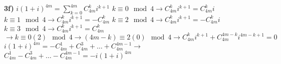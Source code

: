 \documentclass[12pt,a4paper,fleqn]{article}
\begin{document}
{\bf 3f)} $i(1 + i)^{4m} = \sum_{k = 0}^{4m} C_{4m}^k i^{k + 1}$ \newline
$k \equiv 0 \mod 4 \rightarrow C_{4m}^k i^{k + 1} = C_{4m}^k i$ \newline
$k \equiv 1 \mod 4 \rightarrow C_{4m}^k i^{k + 1} = - C_{4m}^k$ \newline
$k \equiv 2 \mod 4 \rightarrow C_{4m}^k i^{k + 1} = - C_{4m}^k i$ \newline
$k \equiv 3 \mod 4 \rightarrow C_{4m}^k i^{k + 1} = C_{4m}^k$ \newline
$\rightarrow k \equiv 0(2) \mod 4 \rightarrow (4m - k) \equiv 2(0) \mod 4 \rightarrow C_{4m}^k i^{k + 1} + C_{4m}^{4m - k} i^{4m - k + 1} = 0$ \newline
$i(1 + i)^{4m} = - C_{4m}^1 + C_{4m}^3 + \ldots + C_{4m}^{4m - 1} \rightarrow$ \newline
$C_{4m}^1 - C_{4m}^3 + \ldots - C_{4m}^{4m - 1} = -i(1 + i)^{4m}$
 
\end{document}
